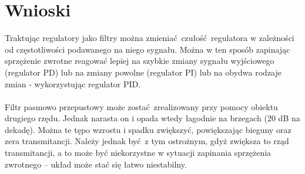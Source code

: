 \documentclass[a4paper, 10pt]{article}
\begin{document}
	\section{Wnioski}
		Traktując regulatory jako filtry można zmieniać czułość regulatora w zależności od częstotliwości podawanego na niego sygnału. Można w ten sposób zapinając sprzężenie zwrotne reagować lepiej na szybkie zmiany sygnału wyjściowego (regulator PD) lub na zmiany powolne (regulator PI) lub na obydwa rodzaje zmian - wykorzystując regulator PID.
		\\ \\
		Filtr pasmowo przepustowy może zostać zrealizowany przy pomocy obiektu drugiego rzędu. Jednak narasta on i opada wtedy  łagodnie na brzegach (20 dB na dekadę). Można te tępo wzrostu i spadku zwiększyć, powiększając bieguny oraz zera transmitancji. Należy jednak być z tym ostrożnym, gdyż zwiększa to rząd transmitancji, a to może być niekorzystne w sytuacji zapinania sprzężenia zwrotnego -- układ może stać się łatwo niestabilny.
		
\end{document}
